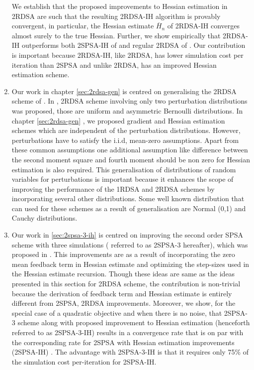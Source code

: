 \begin{enumerate}
We establish that the proposed improvements to Hessian estimation in 2RDSA are such  that the resulting 2RDSA-IH algorithm is provably convergent, in particular, the Hessian estimate $\overline H_n$ of 2RDSA-IH converges almost surely to the true Hessian. 
Further, we show empirically that 2RDSA-IH outperforms both 2SPSA-IH of \cite{spall-jacobian} and regular 2RDSA of \cite{prashanth2015rdsa}. Our contribution is important because 2RDSA-IH, like 2RDSA, has lower simulation cost per iteration than 2SPSA and unlike 2RDSA, has an improved Hessian estimation scheme.
\item Our work in chapter  \ref{sec:2rdsa-gen} is centred on generalising the 2RDSA scheme of \cite{prashanth2015rdsa}. In \cite{prashanth2015rdsa}, 2RDSA scheme involving only two perturbation distributions was proposed, those are uniform and asymmetric Bernoulli distributions. In chapter \ref{sec:2rdsa-gen} , we proposed gradient and Hessian estimation schemes which are independent of the perturbation distributions. However, perturbations have to satisfy the i.i.d, mean-zero assumptions. Apart from these common assumptions  one additional assumption like difference between the second moment square  and fourth moment should be non zero for Hessian estimation is also required. This generalisation of distributions of random variables for perturbations is important because it enhances the scope of improving the performance of the 1RDSA and 2RDSA schemes by incorporating several other distributions. Some well known distribution that can used for these schemes as a result of generalisation are Normal (0,1) and Cauchy distributions.
\item Our work in \ref{sec:2spsa-3-ih} is centred on improving the second order SPSA scheme with three simulations ( referred to as 2SPSA-3 hereafter), which was proposed in  \cite{bhatnagar2015simultaneous}. This improvements are as a result of incorporating the zero mean feedback term in Hessian estimate and optimizing the step-sizes used in the Hessian estimate recursion. Though these ideas are same as the ideas presented in this section for 2RDSA scheme, the contribution is non-trivial because the derivation of feedback term and Hessian estimate is entirely different from 2SPSA, 2RDSA improvements. Moreover, we show, for the special case of a quadratic objective and when there is no noise, that 2SPSA-3 scheme along with proposed improvement to Hessian estimation (henceforth referred to as 2SPSA-3-IH) results in a convergence rate that is on par with the corresponding rate for 2SPSA with Hessian estimation improvements (2SPSA-IH) \cite{spall-jacobian}. The advantage with 2SPSA-3-IH is that it requires only 75\% of the simulation cost per-iteration for 2SPSA-IH.
\end{enumerate}

